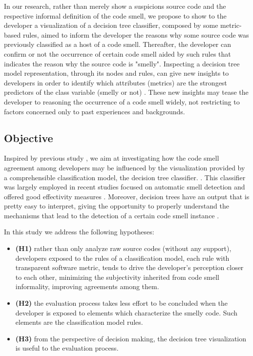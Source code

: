 In our research, rather than merely show a suspicions source code and the respective informal definition of the code smell, we propose to show to the developer a visualization of a decision tree classifier, composed by some metric-based rules, aimed to inform the developer the reasons why some source code was previously classified as a host of a code smell. Thereafter, the developer can confirm or not the occurrence of certain code smell aided by such rules that indicates the reason why the source code is "smelly". Inspecting a decision tree model representation, through its nodes and rules, can give new insights to developers in order to identify which attributes (metrics) are the strongest predictors of the class variable (smelly or not) \cite{freitas2014comprehensible}. These new insights may tease the developer to reasoning the occurrence of a code smell widely, not restricting to factors concerned only to past experiences and backgrounds.

\subsection{Objective}

Inspired by previous study \cite{hozano2018you}, we aim at investigating how the code smell agreement among developers may be influenced by the visualization provided by a comprehensible classification model, the decision tree classifier. \cite{freitas2014comprehensible}. This classifier was largely employed \cite{azeem2019machine} in recent studies focused on automatic smell detection and offered good effectivity measures \cite{amorim2015experience}.  Moreover, decision trees have an output that is pretty easy to interpret, giving the opportunity to properly understand the mechanisms that lead to the detection of a certain code smell instance \cite{azeem2019machine}. 

In this study we address the following hypotheses:
    \begin{itemize}
        \item \textbf{(H1)} rather than only analyze raw source codes (without any support), developers exposed to the rules of a classification model, each rule with transparent software metric, tends to drive the developer's perception closer to each other, minimizing the subjectivity inherited from code smell informality, improving agreements among them.
        \item \textbf{(H2)} the evaluation process takes less effort to be concluded when the developer is exposed to elements which characterize the smelly code. Such elements are the classification model rules.
        \item \textbf{(H3)} from the perspective of decision making, the decision tree visualization is useful to the evaluation process.
    \end{itemize}

